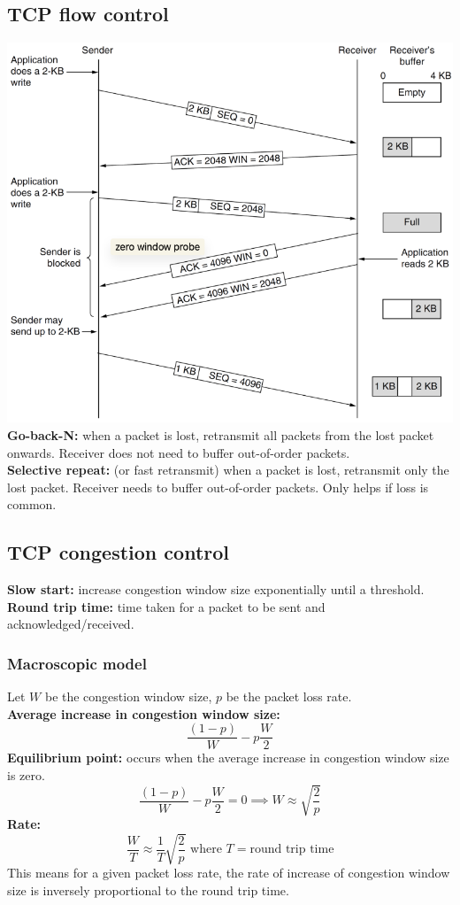 \subsection{TCP flow control}
\includegraphics[width=\linewidth]{figs/tcp-sliding-window.png}
\textbf{Go-back-N:} when a packet is lost, retransmit all packets from the lost packet onwards. Receiver does not need to buffer out-of-order packets.\\
\textbf{Selective repeat:} (or fast retransmit) when a packet is lost, retransmit only the lost packet. Receiver needs to buffer out-of-order packets. Only helps if loss is common.\\

\subsection{TCP congestion control}
\textbf{Slow start:} increase congestion window size exponentially until a threshold.\\
\textbf{Round trip time:} time taken for a packet to be sent and acknowledged/received.\\

\subsubsection{Macroscopic model}
Let $W$ be the congestion window size, $p$ be the packet loss rate.\\
\textbf{Average increase in congestion window size:} $$\frac{(1-p)}{W} - p \frac{W}{2}$$
\textbf{Equilibrium point:} occurs when the average increase in congestion window size is zero.
$$\frac{(1-p)}{W} - p \frac{W}{2} = 0 \implies W \approx \sqrt{\frac{2}{p}}$$
\textbf{Rate:} $$\frac{W}{T} \approx \frac{1}{T} \sqrt{\frac{2}{p}} \text{ where } T = \text{round trip time}$$
This means for a given packet loss rate, the rate of increase of congestion window size is inversely proportional to the round trip time.\\


